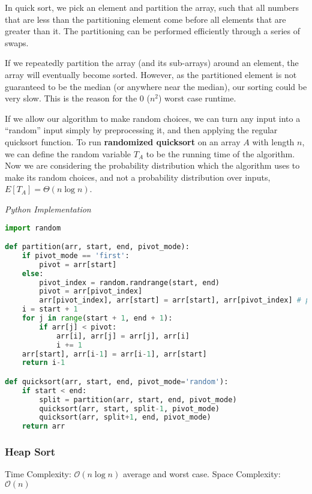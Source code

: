\documentclass{article}
\newcommand{\bigO}{\mathcal{O}}
\begin{document}
     In quick sort, we pick an element and partition the array, such that all numbers that are less than the partitioning element come before all elements that are greater than it. The partitioning can be performed efficiently through a series of swaps.

    If we repeatedly partition the array (and its sub-arrays) around an element, the array will eventually become sorted. However, as the partitioned element is not guaranteed to be the median (or anywhere near the median), our sorting could be very slow. This is the reason for the 0 ($n^2$) worst case runtime.
    
    If we allow our algorithm to make random choices, we can turn any input into a “random” input simply by preprocessing it, and then applying the regular quicksort function. To run \textbf{randomized quicksort} on an array $A$ with length $n$, we can define the random variable $T_A$ to be the running time of the algorithm. Now we are considering the probability distribution which the algorithm uses to make its random choices, and not a probability distribution over inputs, $E[T_A] = \Theta(n \log{n})$.
    
\vspace{8pt} \emph{Python Implementation}
\begin{lstlisting}[language=Python]
import random

def partition(arr, start, end, pivot_mode):
	if pivot_mode == 'first':
		pivot = arr[start]
	else:
		pivot_index = random.randrange(start, end)
		pivot = arr[pivot_index]
		arr[pivot_index], arr[start] = arr[start], arr[pivot_index] # place the pivot at the start
	i = start + 1
	for j in range(start + 1, end + 1):
		if arr[j] < pivot:
			arr[i], arr[j] = arr[j], arr[i]
			i += 1
	arr[start], arr[i-1] = arr[i-1], arr[start]
	return i-1

def quicksort(arr, start, end, pivot_mode='random'):
	if start < end:
		split = partition(arr, start, end, pivot_mode)
		quicksort(arr, start, split-1, pivot_mode)
		quicksort(arr, split+1, end, pivot_mode)
	return arr
\end{lstlisting}
    
    \subsubsection{Heap Sort}
    Time Complexity: $\bigO(n \log n)$ average and worst case. Space Complexity: $\bigO (n)$
    
\end{document}
